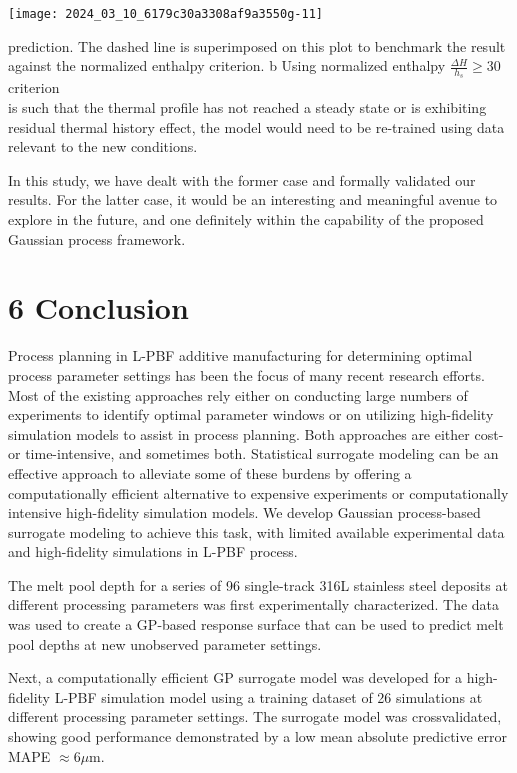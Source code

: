 \documentclass[10pt]{article}
\begin{document}
\begin{center}
\texttt{[image: 2024\_03\_10\_6179c30a3308af9a3550g-11]}
\end{center}

prediction. The dashed line is superimposed on this plot to benchmark the result against the normalized enthalpy criterion. b Using normalized enthalpy $\frac{\Delta H}{h_{s}} \geq 30$ criterion\\
is such that the thermal profile has not reached a steady state or is exhibiting residual thermal history effect, the model would need to be re-trained using data relevant to the new conditions.

In this study, we have dealt with the former case and formally validated our results. For the latter case, it would be an interesting and meaningful avenue to explore in the future, and one definitely within the capability of the proposed Gaussian process framework.

\section*{6 Conclusion}
Process planning in L-PBF additive manufacturing for determining optimal process parameter settings has been the focus of many recent research efforts. Most of the existing approaches rely either on conducting large numbers of experiments to identify optimal parameter windows or on utilizing high-fidelity simulation models to assist in process planning. Both approaches are either cost- or time-intensive, and sometimes both. Statistical surrogate modeling can be an effective approach to alleviate some of these burdens by offering a computationally efficient alternative to expensive experiments or computationally intensive high-fidelity simulation models. We develop Gaussian process-based surrogate modeling to achieve this task, with limited available experimental data and high-fidelity simulations in L-PBF process.

The melt pool depth for a series of 96 single-track 316L stainless steel deposits at different processing parameters was first experimentally characterized. The data was used to create a GP-based response surface that can be used to predict melt pool depths at new unobserved parameter settings.

Next, a computationally efficient GP surrogate model was developed for a high-fidelity L-PBF simulation model using a training dataset of 26 simulations at different processing parameter settings. The surrogate model was crossvalidated, showing good performance demonstrated by a low mean absolute predictive error MAPE $\approx 6 \mu \mathrm{m}$.
\end{document}
